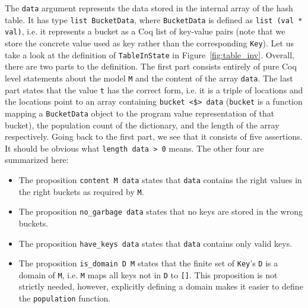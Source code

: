 \documentclass[10pt,a4paper]{article}
\begin{document}
The \texttt{data} argument represents the data stored in the internal array of the hash table. It has type \texttt{list BucketData}, where \texttt{BucketData} is defined as \texttt{list (val * val)}, i.e. it represents a bucket as a Coq list of key-value pairs (note that we store the concrete value used as key rather than the corresponding \texttt{Key}). Let us take a look at the definition of \texttt{TableInState} in Figure~\ref{fig:table_inv}. Overall, there are two parts to the definition. The first part consists entirely of pure Coq level statements about the model \texttt{M} and the content of the array \texttt{data}. The last part states that the value \texttt{t} has the correct form, i.e. it is a triple of locations and the locations point to an array containing \texttt{bucket <\$> data} (\texttt{bucket} is a function mapping a \texttt{BucketData} object to the program value representation of that bucket), the population count of the dictionary, and the length of the array respectively. Going back to the first part, we see that it consists of five assertions. It should be obvious what \texttt{length data > 0} means. The other four are summarized here:
\begin{itemize}
\item The proposition \texttt{content M data} states that \texttt{data} contains the right values in the right buckets as required by \texttt{M}.
\item The proposition \texttt{no\_garbage data} states that no keys are stored in the wrong buckets.
\item The proposition \texttt{have\_keys data} states that \texttt{data} contains only valid keys.
\item The proposition \texttt{is\_domain D M} states that the finite set of \texttt{Key}'s \texttt{D} is a domain of \texttt{M}, i.e. \texttt{M} maps all keys not in \texttt{D} to \texttt{[]}. This proposition is not strictly needed, however, explicitly defining a domain makes it easier to define the \texttt{population} function.
\end{itemize}
\end{document}
